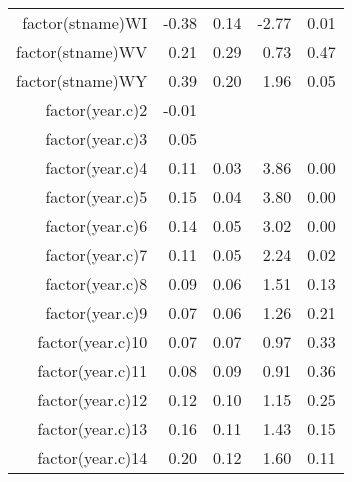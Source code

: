 \begin{table}[ht]
\begin{tabular}{rrrrr}
  factor(stname)WI & -0.38 & 0.14 & -2.77 & 0.01 \\ 
  factor(stname)WV & 0.21 & 0.29 & 0.73 & 0.47 \\ 
  factor(stname)WY & 0.39 & 0.20 & 1.96 & 0.05 \\ 
  factor(year.c)2 & -0.01 &  &  &  \\ 
  factor(year.c)3 & 0.05 &  &  &  \\ 
  factor(year.c)4 & 0.11 & 0.03 & 3.86 & 0.00 \\ 
  factor(year.c)5 & 0.15 & 0.04 & 3.80 & 0.00 \\ 
  factor(year.c)6 & 0.14 & 0.05 & 3.02 & 0.00 \\ 
  factor(year.c)7 & 0.11 & 0.05 & 2.24 & 0.02 \\ 
  factor(year.c)8 & 0.09 & 0.06 & 1.51 & 0.13 \\ 
  factor(year.c)9 & 0.07 & 0.06 & 1.26 & 0.21 \\ 
  factor(year.c)10 & 0.07 & 0.07 & 0.97 & 0.33 \\ 
  factor(year.c)11 & 0.08 & 0.09 & 0.91 & 0.36 \\ 
  factor(year.c)12 & 0.12 & 0.10 & 1.15 & 0.25 \\ 
  factor(year.c)13 & 0.16 & 0.11 & 1.43 & 0.15 \\ 
  factor(year.c)14 & 0.20 & 0.12 & 1.60 & 0.11 \\ 
   \hline
\end{tabular}
\end{table}
